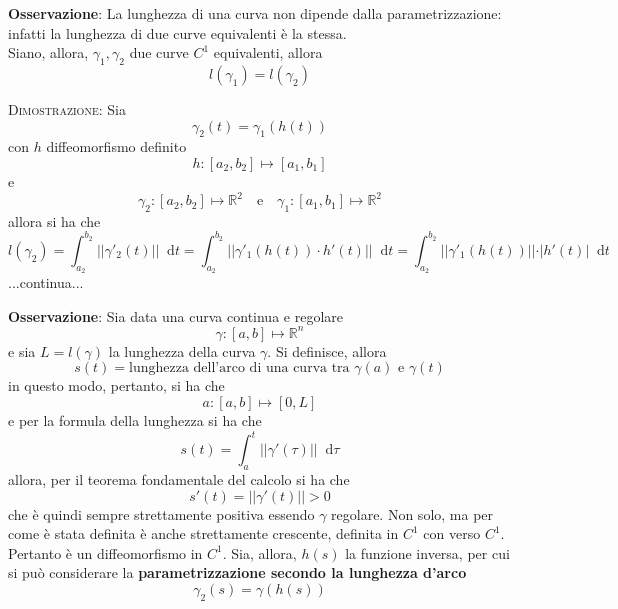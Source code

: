 \documentclass[a4paper]{extarticle}
\newcommand*\dif{\mathop{}\!\mathrm{d}}
\begin{document}
\vspace{2em}
\noindent
\textbf{Osservazione}: La lunghezza di una curva non dipende dalla parametrizzazione: infatti la lunghezza di due curve equivalenti è la stessa.\\
Siano, allora, $\gamma_1,\gamma_2$ due curve $C^1$ equivalenti, allora
\[l(\gamma_1)=l(\gamma_2)\]

\vspace{2em}
\noindent
\normalfont \normalsize
\textsc{Dimostrazione}: Sia
\[\gamma_2(t) = \gamma_1(h(t))\]
con $h$ diffeomorfismo definito
\[h : [a_2,b_2] \longmapsto [a_1,b_1]\]
e
\[\gamma_2 : [a_2,b_2] \longmapsto \mathbb{R}^2 \hspace{1em} \text{e} \hspace{1em} \gamma_1 : [a_1,b_1] \longmapsto \mathbb{R}^2\]
allora si ha che
\[l(\gamma_2) = \int_{a_2}^{b_2} \left \vert \left \vert \gamma'_2(t) \right \vert \right \vert \dif t = \int_{a_2}^{b_2} \left \vert \left \vert \gamma'_1(h(t)) \cdot h'(t) \right \vert \right \vert \dif t = \int_{a_2}^{b_2} \left \vert \left \vert \gamma'_1(h(t)) \right \vert \right \vert \cdot \vert h'(t)\vert \dif t\]
...continua...

\vspace{2em}
\noindent
\textbf{Osservazione}: Sia data una curva continua e regolare
\[\gamma : [a,b] \longmapsto \mathbb{R}^n\] 
e sia $L=l(\gamma)$ la lunghezza della curva $\gamma$. Si definisce, allora
\[s(t) = \text{lunghezza dell'arco di una curva tra } \gamma(a) \text{ e } \gamma(t)\]
in questo modo, pertanto, si ha che
\[a : [a,b] \longmapsto [0,L]\]
e per la formula della lunghezza si ha che
\[s(t) = \int_a^t \left\vert\left\vert\gamma'(\tau)\right\vert\right\vert\dif\tau\]
allora, per il teorema fondamentale del calcolo si ha che
\[s'(t) = \left\vert\left\vert\gamma'(t)\right\vert\right\vert>0\]
che è quindi sempre strettamente positiva essendo $\gamma$ regolare. Non solo, ma per come è stata definita è anche strettamente crescente, definita in $C^1$ con verso $C^1$. Pertanto è un diffeomorfismo in $C^1$. Sia, allora, $h(s)$ la funzione inversa, per cui si può considerare la \textbf{parametrizzazione secondo la lunghezza d'arco}
\[\gamma_2(s)=\gamma(h(s))\]
\end{document}
